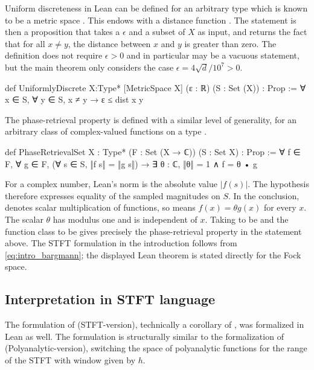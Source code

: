 \documentclass[11pt]{amsart}
\begin{document}
Uniform discreteness in Lean can be defined for an arbitrary type  which is known to be a metric space \lean{[MetricSpace X]}. This endows  with a distance function . The statement  is then a proposition that takes a $\epsilon$ and a subset of $X$ as input, and returns the fact that for all $x\neq y$, the distance between $x$ and $y$ is greater than zero. The definition  does not require $\epsilon>0$ and in particular may be a vacuous statement, but the main theorem  only considers the case $\epsilon = 4\sqrt{d}/10^7>0$.

\begin{leancode}
def UniformlyDiscrete 
    {X:Type*} [MetricSpace X] 
    (ε : ℝ) (S : Set (X)) : Prop := 
      ∀ x ∈ S, ∀ y ∈ S, x ≠ y → ε ≤  dist x y
\end{leancode}


The phase-retrieval property is defined with a similar level of generality, for an arbitrary class of
complex-valued functions on a type .

\begin{leancode}
def PhaseRetrievalSet {X : Type*} (F : Set (X → ℂ))
    (S : Set X) : Prop :=
      ∀ f ∈ F, ∀ g ∈ F, (∀ s ∈ S, ‖f s‖ = ‖g s‖) → ∃ θ : ℂ, ‖θ‖ = 1 ∧ f = θ • g
\end{leancode}

For a complex number, Lean's norm  is the absolute value
$|f(s)|$. The hypothesis therefore expresses equality of the sampled
magnitudes on $S$. In the conclusion,  denotes scalar multiplication
of functions, so  means $f(x)=\theta g(x)$ for every $x$.
The scalar $\theta$ has modulus one and is independent of $x$.
Taking  to be  and the function class to be
 gives precisely the phase-retrieval property in the
statement above. The STFT formulation in the introduction follows from
\eqref{eq:intro_bargmann}; the displayed Lean theorem is stated directly for
the Fock space.

\subsection{Interpretation in STFT language}

The formulation of  (STFT-version), technically a corollary of , was formalized in Lean as well. The formulation is structurally similar to the formalization of  (Polyanalytic-version), switching the space of polyanalytic functions for the range of the STFT with window given by $h$.
\end{document}

